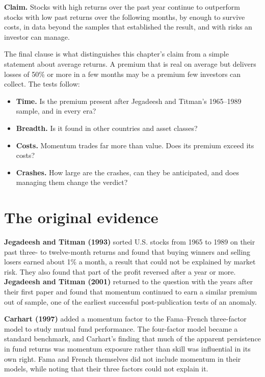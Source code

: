 \begin{callout}
\textbf{Claim.} Stocks with high returns over the past year continue to outperform stocks with low past returns over the following months, by enough to survive costs, in data beyond the samples that established the result, and with risks an investor can manage.
\end{callout}

The final clause is what distinguishes this chapter's claim from a simple statement about average returns. A premium that is real on average but delivers losses of 50\% or more in a few months may be a premium few investors can collect. The tests follow:

\begin{itemize}
  \item \textbf{Time.} Is the premium present after Jegadeesh and Titman's 1965--1989 sample, and in every era?
  \item \textbf{Breadth.} Is it found in other countries and asset classes?
  \item \textbf{Costs.} Momentum trades far more than value. Does its premium exceed its costs?
  \item \textbf{Crashes.} How large are the crashes, can they be anticipated, and does managing them change the verdict?
\end{itemize}

\section{The original evidence}
\label{sec:09-evidence}

\textbf{Jegadeesh and Titman (1993)} sorted U.S. stocks from 1965 to 1989 on their past three- to twelve-month returns and found that buying winners and selling losers earned about 1\% a month, a result that could not be explained by market risk. They also found that part of the profit reversed after a year or more. \textbf{Jegadeesh and Titman (2001)} returned to the question with the years after their first paper and found that momentum continued to earn a similar premium out of sample, one of the earliest successful post-publication tests of an anomaly.

\textbf{Carhart (1997)} added a momentum factor to the Fama--French three-factor model to study mutual fund performance. The four-factor model became a standard benchmark, and Carhart's finding that much of the apparent persistence in fund returns was momentum exposure rather than skill was influential in its own right. Fama and French themselves did not include momentum in their models, while noting that their three factors could not explain it.

